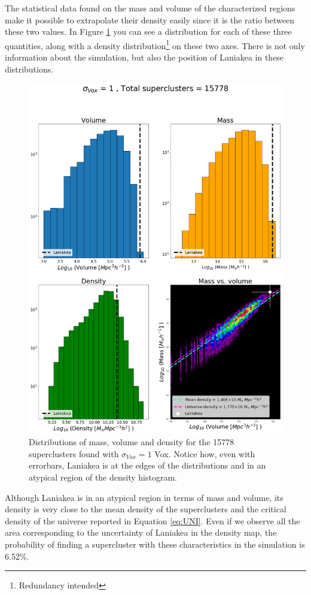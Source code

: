 The statistical data found on the mass and volume of the characterized regions make it possible to extrapolate their density easily since it is the ratio between these two values. In Figure \ref{fig:HISTVMD1} you can see a distribution for each of these three quantities, along with a density distribution\footnote{Redundancy intended} on these two axes. There is not only information about the simulation, but also the position of Laniakea in these distributions.

\begin{figure}
    \centering
    \includegraphics[width=360pt]{HistVMD_1.png}
    \caption{Distributions of mass, volume and density for the 15778 superclusters found with $\sigma_{Vox} = 1 $ Vox. Notice how, even with errorbars, Laniakea is at the edges of the distributions and in an atypical region of the density histogram. }
    \label{fig:HISTVMD1}
\end{figure}

Although Laniakea is in an atypical region in terms of mass and volume, its density is very close to the mean density of the superclusters and the critical density of the universe reported in Equation \ref{eq:UNI}. Even if we observe all the area corresponding to the uncertainty of Laniakea in the density map, the probability of finding a supercluster with these characteristics in the simulation is 6.52\%.

